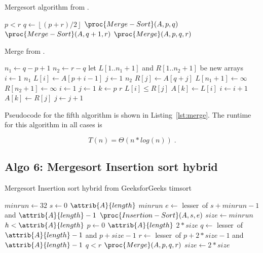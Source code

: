 \begin{algorithm}[H]
  \caption{Mergesort algorithm from \cite[Ch.~2.1]{cormen_introduction_2009}.}
  \label{lst:mergesort_algo}
  \begin{codebox}
	\li \If $p < r$
	\li \Then $q \gets \left\lfloor(p + r) / 2\right\rfloor$
	\li 	$\proc{Merge-Sort}(A, p, q)$
	\li 	$\proc{Merge-Sort}(A, q+1, r)$
	\li 	$\proc{Merge}(A, p, q, r)$
	\End
  \end{codebox}
\end{algorithm}

\begin{algorithm}[H]
  \caption{Merge from \cite[Ch.~2.1]{cormen_introduction_2009}.}
  \label{lst:merge}
  \begin{codebox}
	\li $n_1 \gets q-p+1$
	\li $n_2 \gets r-q$
	\li let $L[1..n_1+1]$ and $R[1..n_2+1]$ be new arrays
	\li \For $i \gets 1$ \To $n_1$
	\li \Do $L[i] \gets A[p+i-1]$
	\End
	\li \For $j \gets 1$ \To $n_2$
	\li \Do $R[j] \gets A[q+j]$
	\End
	\li $L[n_1+1] \gets \infty$
	\li $R[n_2+1] \gets \infty$
	\li $i \gets 1$
	\li $j \gets 1$
	\li \For $k \gets p$ \To $r$
	\li \Do \If $L[i] \le R[j]$
	\li 	\Then $A[k] \gets L[i]$
	\li 		$i \gets i+1$
	\li 	\Else $A[k] \gets R[j]$
	\li 	$j \gets j+1$
	\End
	\End
  \end{codebox}
\end{algorithm}

Pseudocode for the fifth algorithm is shown in
Listing~\ref{lst:merge}. The runtime for this algorithm in all cases is

\begin{equation}
  T(n) = \Theta(n*log(n)) \;.  \label{eq:ins_sort_best}
\end{equation}

\subsection{Algo 6: Mergesort Insertion sort hybrid}\label{sec:algo6}

\begin{algorithm}[H]
  \caption{Mergesort Insertion sort hybrid from GeeksforGeeks timsort}
  \label{lst:mergeinsert_algo}
  \begin{codebox}
    \li $minrun \gets 32$
    \li \For $s \gets 0$ \To $\attrib{A}{length}$ \By $minrun$
    \li \Do $e \gets$ lesser~of $s+minrun-1$ and $\attrib{A}{length}-1$
    \li		$\proc{Insertion-Sort}(A, s, e)$
    \End
    \li $size \gets minrun$
    \li \While $h<\attrib{A}{length}$
    \li \Do \For $p \gets 0$ \To $\attrib{A}{length}$ \By $2*size$
    \li 	\Do $q \gets$ lesser~of $\attrib{A}{length}-1$ and $p+size-1$
    \li			$r \gets$ lesser~of $p+2*size-1$ and $\attrib{A}{length}-1$
    \li			\If $q<r$
    \li 		\Do $\proc{Merge}(A, p, q, r)$
    \End
    \End
    \li 	$size \gets 2*size$
    \End		
  \end{codebox}
\end{algorithm}

